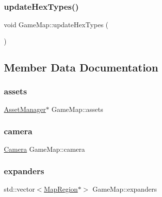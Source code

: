 \subsubsection{\texorpdfstring{update\+Hex\+Types()}{updateHexTypes()}}
{\footnotesize\ttfamily void Game\+Map\+::update\+Hex\+Types (\begin{DoxyParamCaption}{ }\end{DoxyParamCaption})\hspace{0.3cm}{\ttfamily [private]}}



\subsection{Member Data Documentation}
\mbox{\label{class_game_map_af63a6638804af038977a55f6e4d6d6bd}} 
\subsubsection{\texorpdfstring{assets}{assets}}
{\footnotesize\ttfamily \hyperlink{class_asset_manager}{Asset\+Manager}$\ast$ Game\+Map\+::assets\hspace{0.3cm}{\ttfamily [private]}}

\mbox{\label{class_game_map_a5004693ddf0a979bd379fc1a32f5ab8f}} 
\subsubsection{\texorpdfstring{camera}{camera}}
{\footnotesize\ttfamily \hyperlink{class_camera}{Camera} Game\+Map\+::camera\hspace{0.3cm}{\ttfamily [private]}}

\mbox{\label{class_game_map_a23fc8cbef7e92535488681204927b5a1}} 
\subsubsection{\texorpdfstring{expanders}{expanders}}
{\footnotesize\ttfamily std\+::vector$<$\hyperlink{class_map_region}{Map\+Region}$\ast$$>$ Game\+Map\+::expanders\hspace{0.3cm}{\ttfamily [private]}}

